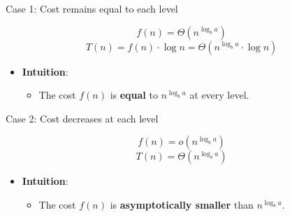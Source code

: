 \documentclass[10pt,aspectratio=43]{beamer}
\begin{document}
\begin{frame}{Case 1: Cost remains equal to each level}

\begin{block}{}
\[
f(n) = \Theta(n^{\log_b a})
\]
\[
T(n) = f(n) \cdot \log n = \Theta(n^{\log_b a} \cdot \log n)
\]
\end{block}

\begin{itemize}
    \item \textbf{Intuition}:
    \begin{itemize}
            \item The cost \( f(n) \) is \textbf{equal} to \( n^{\log_b a} \) at every level.


    \end{itemize}
\end{itemize}

\end{frame}

\begin{frame}{Case 2: Cost decreases at each level}

\begin{block}{}
\[
f(n) = o(n^{\log_b a})
\]
\[
T(n) = \Theta(n^{\log_b a})
\]
\end{block}

\begin{itemize}
    \item \textbf{Intuition}:
    \begin{itemize}
        \item The cost \( f(n) \) is \textbf{asymptotically smaller} than \( n^{\log_b a} \).
    \end{itemize}
\end{itemize}

\end{frame}
\end{document}
